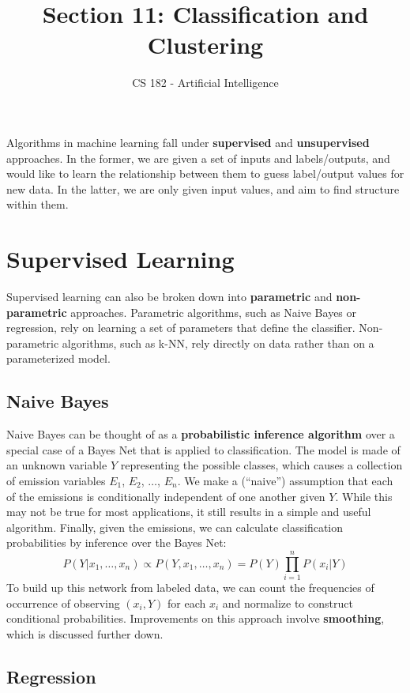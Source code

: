 \documentclass[11pt]{article}
\title{Section 11: Classification and Clustering}
\date{}
\author{CS 182 - Artificial Intelligence}
\begin{document}
\maketitle

\noindent Algorithms in machine learning fall under {\bf{supervised}} and {\bf{unsupervised}} approaches. In the former, we are given a set of inputs and labels/outputs, and would like to learn the relationship between them to guess label/output values for new data. In the latter, we are only given input values, and aim to find structure within them.

\section*{Supervised Learning}

Supervised learning can also be broken down into {\bf{parametric}} and {\bf{non-parametric}} approaches. Parametric algorithms, such as Naive Bayes or regression, rely on learning a set of parameters that define the classifier. Non-parametric algorithms, such as k-NN, rely directly on data rather than on a parameterized model. 

\subsection*{Naive Bayes}

Naive Bayes can be thought of as a {\bf{probabilistic inference algorithm}} over a special case of a Bayes Net that is applied to classification. The model is made of an unknown variable $Y$ representing the possible classes, which causes a collection of emission variables $E_1$, $E_2$, $\dots$, $E_n$. We make a (``naive'') assumption that each of the emissions is conditionally independent of one another given $Y$. While this may not be true for most applications, it still results in a simple and useful algorithm. Finally, given the emissions, we can calculate classification probabilities by inference over the Bayes Net:
\[
P(Y | x_1, \ldots, x_n) \propto P(Y, x_1, \ldots, x_n) = P(Y) \prod_{i=1}^n P(x_i|Y)
\]
To build up this network from labeled data, we can count the frequencies of occurrence of observing $(x_i, Y)$ for each $x_i$ and normalize to construct conditional probabilities. Improvements on this approach involve {\bf{smoothing}}, which is discussed further down.


\subsection*{Regression}
\end{document}
